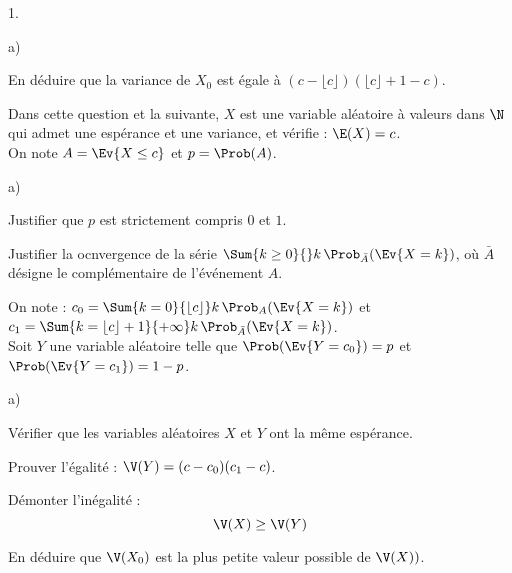 \begin{exerciceAP}
\begin{noliste}{1.}
\begin{noliste}{a)}
      \item En déduire que la variance de $X_0$ est égale à 
      $(c- \lfloor c \rfloor )(\lfloor c \rfloor +1-c)$.
    \end{noliste}
    
    \item Dans cette question et la suivante, $X$ est une variable 
    aléatoire à valeurs dans $\N$ qui admet une espérance et une 
    variance, et vérifie : $\E(X)=c$.\\
    On note $A= \Ev{X \leq c}$ et $p=\Prob(A)$.
    \begin{noliste}{a)}
    \setlength{\itemsep}{2mm}
      \item Justifier que $p$ est strictement compris $0$ et $1$.
      
      \item Justifier la ocnvergence de la série $\Sum{k\geq 0}{} 
      k \, \Prob_{\bar{A}}(\Ev{X=k})$, où $\bar{A}$ désigne le 
      complémentaire de l'événement $A$.
    \end{noliste}
    
    \item On note : $c_0 = \Sum{k=0}{\lfloor c \rfloor} 
    k \, \Prob_A(\Ev{X=k})$ et $c_1 = \Sum{k= \lfloor c \rfloor +1}
    {+\infty} k \, \Prob_{\bar{A}}(\Ev{X=k})$.\\[.1cm]
    Soit $Y$ une variable aléatoire telle que $\Prob(\Ev{Y=c_0})
    =p$ et $\Prob(\Ev{Y=c_1})=1-p$.
    \begin{noliste}{a)}
    \setlength{\itemsep}{2mm}
      \item Vérifier que les variables aléatoires $X$ et $Y$ ont la même
      espérance.
      
      \item Prouver l'égalité : $\V(Y) = (c-c_0)(c_1-c)$.
      
      \item Démonter l'inégalité :
      \[
        \V(X) \geq \V(Y)
      \]
      
      \item En déduire que $\V(X_0)$ est la plus petite valeur possible 
      de $\V(X))$.
    \end{noliste}
  \end{noliste}
\end{exerciceAP} 


